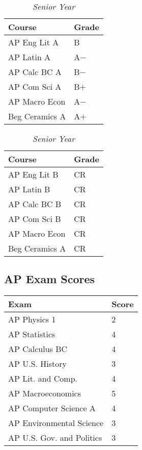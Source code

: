 \documentclass[11pt]{article}
\renewcommand{\it}[1]{\textit{{#1}}}
\begin{document}
\begin{table}[H]
    \centering
    \caption*{\it{Senior Year}}
    \vspace{-0.8em}
    \begin{tabular}{l|l}
        Course       & Grade \\
        \hline
        AP Eng Lit A   & B   \\
        AP Latin A     & A$-$  \\
        AP Calc BC A   & B$-$  \\
        AP Com Sci A   & B$+$  \\
        AP Macro Econ  & A$-$  \\
        Beg Ceramics A & A$+$  \\
    \end{tabular}
    \hspace{2em}
    \begin{tabular}{l|l}
        Course       & Grade \\
        \hline
        AP Eng Lit B   & CR  \\
        AP Latin B     & CR  \\
        AP Calc BC B   & CR  \\
        AP Com Sci B   & CR  \\
        AP Macro Econ  & CR  \\
        Beg Ceramics A & CR  \\
    \end{tabular}
\end{table}
\newpage

\subsection{AP Exam Scores}
\begin{table}[H]
    \centering
    \vspace{-0.8em}
    \begin{tabular}{l|l}
        Exam    & Score \\
        \hline
        AP Physics 1              & 2 \\
        AP Statistics             & 4 \\
        AP Calculus BC            & 4 \\
        AP U.S. History           & 3 \\
        AP Lit. and Comp.         & 4 \\
        AP Macroeconomics         & 5 \\
        AP Computer Science A     & 4 \\
        AP Environmental Science  & 3 \\
        AP U.S. Gov. and Politics & 3 \\
    \end{tabular}
\end{table}
\end{document}
